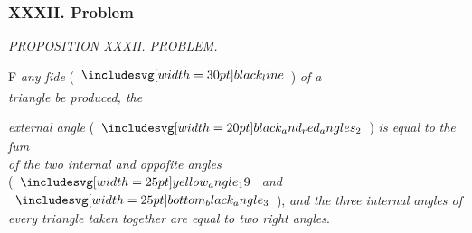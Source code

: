 \documentclass[11pt,preview]{standalone}
\begin{document}
\subsubsection{XXXII. Problem}

\begin{minipage}[t]{0.54\textwidth}
    \begin{center}
        \textit{PROPOSITION XXXII. PROBLEM.}\label{book1pr32} \\
    \end{center}

    \hfill

    \begin{center}
        \raggedright \lettrine[lines=3, loversize=1, nindent=0pt]{}{}F \textit{any ſide} (\hspace{-1ex}$\blackline$\hspace{-1ex}) \textit{of a\\ triangle be produced, the}
    \end{center}
    \raggedright \textit{external angle} (\hspace{-1ex}$\img[0][0][20]{black_and_red_angles_2}$\hspace{-1ex}) \textit{is equal to} \textit{the ſum\\ of the two internal and oppoſite angles}\\ (\hspace{-1ex}$\img{yellow_angle_19}$ \textit{and} $\img{bottom_black_angle_3}$\hspace{-1ex}), \textit{and the three internal angles of every triangle taken together are equal to two right angles}.
\end{minipage}%
\hfill
\begin{minipage}[t]{0.43\textwidth}
    \vspace{20pt}
    
\end{minipage}

\hfill

\hfill
\end{document}
